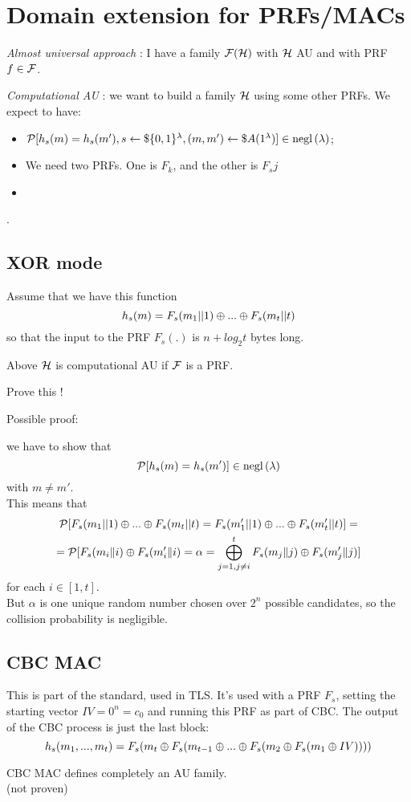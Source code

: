 \section{Domain extension for PRFs/MACs}

\textit{Almost universal approach} : I have a family $\mathcal{F}(\mathcal{H})$ with $\mathcal{H}$ AU and with PRF $f \in \mathcal{F}$.

\textit{Computational AU} : we want to build a family $\mathcal{H}$ using some other
PRFs. We expect to have:
\begin{itemize}
    \item $ \mathcal{P} [ h_{s}(m)=h_{s}(m'), s\leftarrow\$\{0,1\}^{\lambda} , (m, m')\leftarrow\$A(1^{\lambda}) ] \in \mathrm{negl}\left({\lambda}\right) $;
    \item We need two PRFs. One is $F_{k}$, and the other is $F_{s}j$
    \item {}
\end{itemize}.

\subsection{XOR mode}
Assume that we have this function
\[
    h_{s}(m)=F_{s}(m_{1}||1) \oplus ... \oplus F_{s}(m_{t}||t)
\]
so that the input to the PRF $F_{s}(.)$ is $n + log_{2} t$ bytes long.
\begin{lemma}
    Above $\mathcal{H}$ is computational AU if $\mathcal{F}$ is a PRF.
\end{lemma}
\begin{exercise}
    Prove this !
\end{exercise}
Possible proof:

we have to show that
\[
    \mathcal{P} [ h_{s}(m)=h_{s}(m') ] \in \mathrm{negl}\left({\lambda}\right)   
\]
with $m\not=m'$.\\
This means that 
    \begin{gather*}
        \mathcal{P} [F_{s}(m_{1}||1) \oplus ... \oplus F_{s}(m_{t}||t) = F_{s}(m'_{1}||1) \oplus ...
        \oplus F_{s}(m'_{t}||t)]  =\\
        = \mathcal{P} [ F_{s}(m_{i}\|i) \oplus  F_{s}(m'_{i}\|i)= \alpha  = \bigoplus_{j=1, j\not=i}^{t} 
        F_{s}(m_{j}\|j) \oplus  F_{s}(m'_{j}\|j)]
    \end{gather*}
    for each $i \in [1,t]$.\\
    But $\alpha$ is one unique random number chosen over $2^{n}$ possible
    candidates, so the collision probability is negligible.\\
\subsection{CBC MAC}
This is part of the standard, used in TLS. It's used with a PRF $F_{s}$, setting
the starting vector $IV=0^{n}=c_{0}$ and running this PRF as part of CBC. The
output of the CBC process is just the last block:
\[
    h_{s}(m_{1}, ..., m_{t})=F_{s} ( m_{t} \oplus F_{s}(m_{t-1} \oplus ... \oplus 
    F_{s}(m_{2} \oplus F_{s}(m_{1} \oplus IV))  ))
\]
\begin{lemma}
    CBC MAC defines completely an AU family.\\
    (not proven)
\end{lemma}

